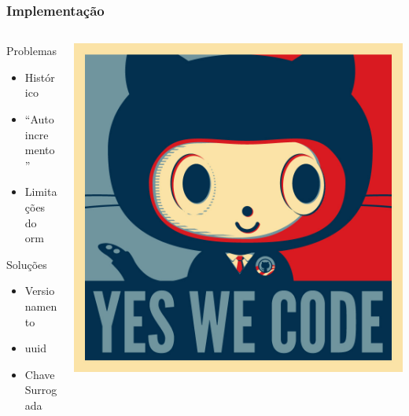 \documentclass{beamer}
\begin{document}
\begin{frame}
  \frametitle{Implementação}
  \begin{columns}[T]
    \begin{column}{.5\textwidth}
      \begin{block}{Problemas}
        \begin{itemize}
          \itemsep 1em
          \item Histórico
          \item ``Auto incremento''
          \item Limitações do orm
        \end{itemize}
      \end{block}
      \begin{block}{Soluções}
        \begin{itemize}
          \item Versionamento
          \item uuid
          \item Chave Surrogada
        \end{itemize}
      \end{block}
    \end{column}
    \begin{column}{.5\textwidth}
      \includegraphics[width=\textwidth]{implementacao.jpg}
    \end{column}
  \end{columns}
\end{frame}
\end{document}
